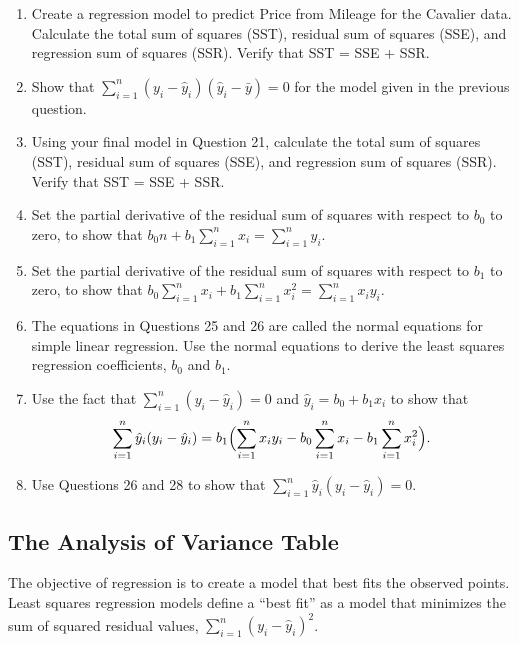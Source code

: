 \documentclass[
]{report}
\providecommand{\tightlist}{%
  \setlength{\itemsep}{0pt}\setlength{\parskip}{0pt}}
\begin{document}
\begin{enumerate}
\def\labelenumi{\arabic{enumi}.}
\setcounter{enumi}{21}
\tightlist
\item
  Create a regression model to predict Price from Mileage for the Cavalier data. Calculate the total sum of squares (SST), residual sum of squares (SSE), and regression sum of squares (SSR). Verify that SST = SSE + SSR.\\
\item
  Show that \(\sum_{i=1}^n (y_i - \hat{y}_i)(\hat{y}_i - \bar{y}) = 0\) for the model given in the previous question.\\
\item
  Using your final model in Question 21, calculate the total sum of squares (SST), residual sum of squares (SSE), and regression sum of squares (SSR). Verify that SST = SSE + SSR.\\
\item
  Set the partial derivative of the residual sum of squares with respect to \(b_0\) to zero, to show that \(b_0 n + b_1 \sum_{i=1}^n x_i = \sum_{i=1}^n y_i.\)
\item
  Set the partial derivative of the residual sum of squares with respect to \(b_1\) to zero, to show that \(b_0 \sum_{i=1}^n x_i + b_1 \sum_{i=1}^n x_i^2 = \sum_{i=1}^n x_i y_i.\)
\item
  The equations in Questions 25 and 26 are called the normal equations for simple linear regression. Use the normal equations to derive the least squares regression coefficients, \(b_0\) and \(b_1\).\\
\item
  Use the fact that \(\sum_{i=1}^n (y_i - \hat{y}_i) = 0\) and \(\hat{y}_i = b_0 + b_1 x_i\) to show that
  \begin{equation}
  \sum_{i=1}^n \hat{y}_i (y_i - \hat{y}_i)
    = b_1 \Bigl(\sum_{i=1}^n x_i y_i - b_0 \sum_{i=1}^n x_i - b_1 \sum_{i=1}^n x_i^2\Bigr). \notag
  \end{equation}
\item
  Use Questions 26 and 28 to show that \(\sum_{i=1}^n \hat{y}_i (y_i - \hat{y}_i) = 0.\)
\end{enumerate}

\subsection{The Analysis of Variance Table}\label{the-analysis-of-variance-table}

The objective of regression is to create a model that best fits the observed points. Least squares regression models define a ``best fit'' as a model that minimizes the sum of squared residual values, \(\sum_{i=1}^n (y_i - \hat{y}_i)^2\).
\end{document}
